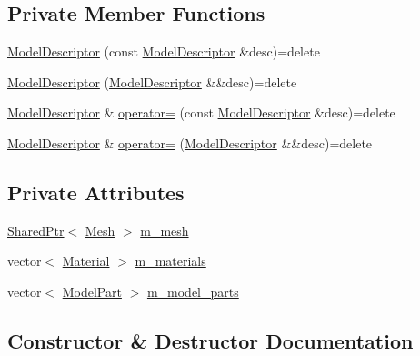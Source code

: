 \subsection*{Private Member Functions}
\begin{DoxyCompactItemize}
\item 
\hyperlink{classmage_1_1_model_descriptor_af44185efc20e10ede762d29bc454c5f3}{Model\+Descriptor} (const \hyperlink{classmage_1_1_model_descriptor}{Model\+Descriptor} \&desc)=delete
\item 
\hyperlink{classmage_1_1_model_descriptor_a0b9c94c989ef70b6149a571106a1a73c}{Model\+Descriptor} (\hyperlink{classmage_1_1_model_descriptor}{Model\+Descriptor} \&\&desc)=delete
\item 
\hyperlink{classmage_1_1_model_descriptor}{Model\+Descriptor} \& \hyperlink{classmage_1_1_model_descriptor_a734b17224719896921e9f6252ee88483}{operator=} (const \hyperlink{classmage_1_1_model_descriptor}{Model\+Descriptor} \&desc)=delete
\item 
\hyperlink{classmage_1_1_model_descriptor}{Model\+Descriptor} \& \hyperlink{classmage_1_1_model_descriptor_ae2ae685569c0ae534d9f0b5622a807d0}{operator=} (\hyperlink{classmage_1_1_model_descriptor}{Model\+Descriptor} \&\&desc)=delete
\end{DoxyCompactItemize}
\subsection*{Private Attributes}
\begin{DoxyCompactItemize}
\item 
\hyperlink{namespacemage_a1e01ae66713838a7a67d30e44c67703e}{Shared\+Ptr}$<$ \hyperlink{classmage_1_1_mesh}{Mesh} $>$ \hyperlink{classmage_1_1_model_descriptor_a89ac31356e7690007c618be387399151}{m\+\_\+mesh}
\item 
vector$<$ \hyperlink{structmage_1_1_material}{Material} $>$ \hyperlink{classmage_1_1_model_descriptor_a672238b257f99836243d84f634ffeea2}{m\+\_\+materials}
\item 
vector$<$ \hyperlink{structmage_1_1_model_part}{Model\+Part} $>$ \hyperlink{classmage_1_1_model_descriptor_a200c6e44c9b6a5bde5c8490fb93ba00f}{m\+\_\+model\+\_\+parts}
\end{DoxyCompactItemize}


\subsection{Constructor \& Destructor Documentation}
\hypertarget{classmage_1_1_model_descriptor_a165ff1d3c0360be3ecb19c21c2b49cea}{}\label{classmage_1_1_model_descriptor_a165ff1d3c0360be3ecb19c21c2b49cea} 
